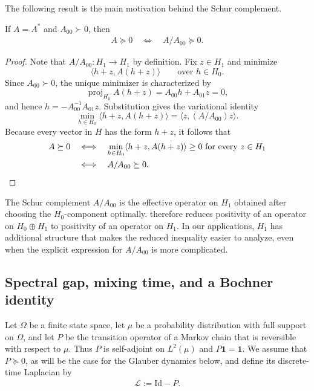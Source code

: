 \documentclass[a4paper,12pt]{article}
\theoremstyle{plain}
\theoremstyle{definition}
\def\*#1{\mathbf{#1}} %
\def\+#1{\mathcal{#1}} %
\def\*#1{\boldsymbol{#1}} %
\def\+#1{\mathcal{#1}} %
\begin{document}
The following result is the main motivation behind the Schur complement.
\begin{proposition} \label{prop:Schur-complement-elimination}
  If $A=A^*$ and $A_{00}\succ0$, then
  \begin{align} \label{eq:Schur-positivity-equivalence}
    A\succeq0
    \quad\Longleftrightarrow\quad
    A/A_{00}\succeq0.
  \end{align}
\end{proposition}
\begin{proof}
Note that $A/A_{00}: H_1 \to H_1$ by definition.
Fix $z\in H_1$ and minimize
\[
  \langle h+z,A(h+z)\rangle
  \qquad\text{over }h\in H_0.
\]
Since $A_{00}\succ0$, the unique minimizer is characterized by
\[
  \operatorname{proj}_{H_0}A(h+z)
  =A_{00}h+A_{01}z=0,
\]
and hence $h=-A_{00}^{-1}A_{01}z$. Substitution gives the
variational identity
\[
  \min_{h\in H_0}\langle h+z,A(h+z)\rangle
  =\langle z,(A/A_{00})z\rangle .
\]
Because every vector in $H$ has the form $h+z$, it follows that
\begin{align*}
  A\succeq0
  &\quad\Longleftrightarrow\quad
  \min_{h\in H_0}\langle h+z,A(h+z)\rangle\geq0
  \ \text{for every }z\in H_1 \\
  &\quad\Longleftrightarrow\quad
  A/A_{00}\succeq0 . \qedhere
\end{align*}
\end{proof}

\begin{remark}
The Schur complement $A/A_{00}$ is the effective operator on $H_1$
obtained after choosing the $H_0$-component optimally.
therefore reduces positivity of an operator on $H_0\oplus H_1$ to
positivity of an operator on $H_1$. In our applications, $H_1$ has
additional structure that makes the reduced inequality easier to analyze,
even when the explicit expression for $A/A_{00}$ is more complicated.
\end{remark}

\subsection{Spectral gap, mixing time, and a Bochner identity}
Let $\Omega$ be a finite state space, let $\mu$ be a probability
distribution with full support on $\Omega$, and let $P$ be the transition
operator of a Markov chain that is reversible with respect to $\mu$.
Thus $P$ is self-adjoint on $L^2(\mu)$ and $P\*1=\*1$.  We assume that
$P\succeq0$, as will be the case for the Glauber dynamics below, and
define its discrete-time Laplacian by
\begin{align*}
  \+L:=\mathrm{Id}-P.
\end{align*}
\end{document}
